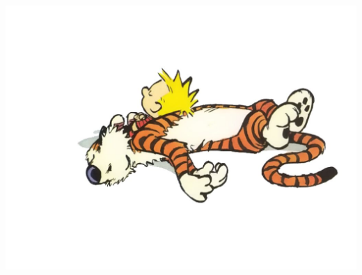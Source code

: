 \documentclass[12pt,a4paper]{report}
\begin{document}
\begin{center}
\includegraphics[scale =0.5]{conclu.jpg}
\end{center}
\end{document}
